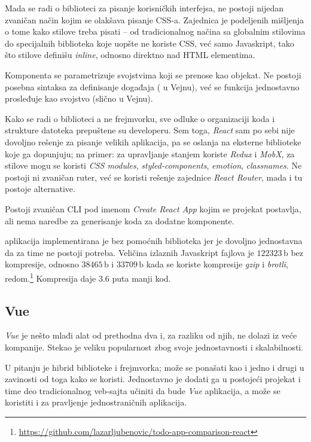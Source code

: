 Mada se radi o biblioteci za pisanje korisničkih interfejsa, ne postoji nijedan zvaničan način kojim se olakšava pisanje CSS-a.
Zajednica je podeljenih mišljenja o tome kako stilove treba pisati -- od tradicionalnog načina sa globalnim stilovima do specijalnih biblioteka koje uopšte ne koriste CSS, već samo Javaskript, tako što stilove definišu \textit{inline}, odnosno direktno nad HTML elementima.

Komponenta se parametrizuje svojstvima koji se prenose kao objekat.
Ne postoji posebna sintaksa za definisanje događaja ( u Vejnu), već se funkcija jednostavno prosleđuje kao svojstvo (slično  u Vejnu).

Kako se radi o biblioteci a ne frejmvorku, sve odluke o organizaciji koda i strukture datoteka prepuštene su developeru.
Sem toga, \textsl{React} sam po sebi nije dovoljno rešenje za pisanje velikih aplikacija, pa se oslanja na eksterne biblioteke koje ga dopunjuju; na primer: za upravljanje stanjem koriste \textsl{Redux} i \textsl{MobX}, za stilove mogu se koristi \textsl{CSS modules}, \textsl{styled-components}, \textsl{emotion}, \textsl{classnames}.
Ne postoji ni zvaničan ruter, već se koristi rešenje zajednice \textsl{React Router}, mada i tu postoje alternative.

Postoji zvaničan CLI pod imenom \textsl{Create React App} kojim se projekat postavlja, ali nema naredbe za generisanje koda za dodatne komponente.

 aplikacija implementirana je bez pomoćnih biblioteka jer je dovoljno jednostavna da za time ne postoji potreba.
Veličina izlaznih Javaskript fajlova je $122323\,\mathrm{b}$ bez kompresije, odnosno $38465\,\mathrm{b}$ i $33709\,\mathrm{b}$ kada se koriste kompresije \textsl{gzip} i \textsl{brotli}, redom.\footnote{\url{https://github.com/lazarljubenovic/todo-app-comparison-react}} Kompresija daje $3.6$ puta manji kod.

\subsection{Vue}

\textsl{Vue} je nešto mlađi alat od prethodna dva i, za razliku od njih, ne dolazi iz veće kompanije.
Stekao je veliku popularnost zbog svoje jednostavnosti i skalabilnosti.

U pitanju je hibrid biblioteke i frejmvorka; može se ponašati kao i jedno i drugi u zavinosti od toga kako se koristi.
Jednostavno je dodati ga u postojeći projekat i time deo tradicionalnog veb-sajta učiniti da bude \textsl{Vue} aplikacija, a može se koristiti i za pravljenje jednostraničnih aplikacija.


